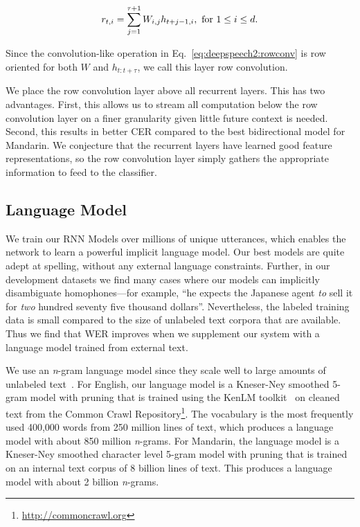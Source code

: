 \begin{align}
\label{eq:deepspeech2:rowconv}
r_{t,i} = \sum_{j=1}^{\tau+1} W_{i,j} h_{t+j-1, i}, {\rm \ for\ } 1 \leq i \leq d.
\end{align}

Since the convolution-like operation in Eq.~\ref{eq:deepspeech2:rowconv} is row
oriented for both $W$ and $h_{t:t+\tau}$, we call this layer row convolution.

We place the row convolution layer above all recurrent layers. This has two
advantages. First, this allows us to stream all computation below the row
convolution layer on a finer granularity given little future context is needed.
Second, this results in better CER compared to the best bidirectional model for
Mandarin. We conjecture that the recurrent layers have learned good feature
representations, so the row convolution layer simply gathers the appropriate
information to feed to the classifier. 


\subsection{Language Model}
\label{sec:deepspeech2:languagemodel}

We train our RNN Models over millions of unique utterances, which enables the
network to learn a powerful implicit language model. Our best models are quite
adept at spelling, without any external language constraints. Further, in our
development datasets we find many cases where our models can implicitly
disambiguate homophones---for example, ``he expects the Japanese agent
\emph{to} sell it for \emph{two} hundred seventy five thousand dollars''.
Nevertheless, the labeled training data is small compared to the size of
unlabeled text corpora that are available. Thus we find that WER improves when
we supplement our system with a language model trained from external text. 

We use an \emph{n}-gram language model since they scale well to large amounts
of unlabeled text~\cite{hannun2014deepspeech}. For English, our language model
is a Kneser-Ney smoothed 5-gram model with pruning that is trained using the
KenLM toolkit~\cite{heafield2013} on cleaned text from the Common Crawl
Repository\footnote{\url{http://commoncrawl.org}}. The vocabulary is the most
frequently used 400,000 words from 250 million lines of text, which produces a
language model with about 850 million \emph{n}-grams. For Mandarin, the
language model is a Kneser-Ney smoothed character level 5-gram model with
pruning that is trained on an internal text corpus of 8 billion lines of text.
This produces a language model with about 2 billion \emph{n}-grams.

